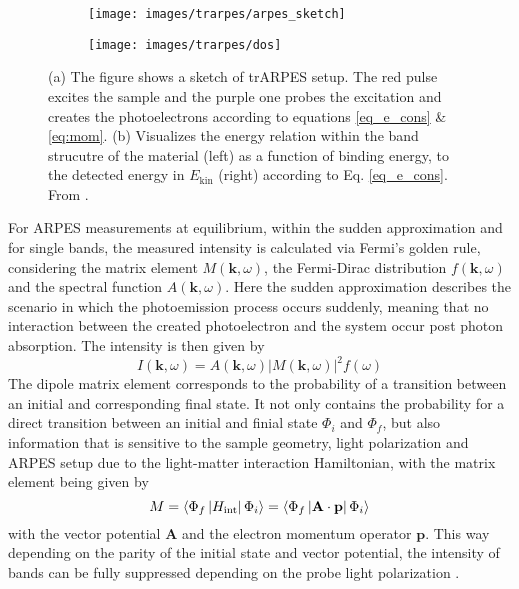 \begin{figure}
	\centering
	\begin{subfigure}[b]{0.49\textwidth}
		\texttt{[image: images/trarpes/arpes\_sketch]}
		\caption{}
	\end{subfigure}
	\hfill
	\begin{subfigure}[b]{0.4\textwidth}
		\texttt{[image: images/trarpes/dos]}
		\caption{}
	\end{subfigure}
	\caption{(a) The figure shows a sketch of trARPES setup. The red pulse excites the sample and the purple one probes the excitation and creates the photoelectrons according to equations \ref{eq_e_cons} \& \ref{eq:mom}. (b) Visualizes the energy relation within the band strucutre of the material (left) as a function of binding energy, to the detected energy in $E_\text{kin}$ (right) according to Eq. \ref{eq_e_cons}. From \cite{hufner_photoelectron_1995}.}
	\label{fig:arpes_sketch}
\end{figure}

For ARPES measurements at equilibrium, within the sudden approximation and for single bands, the measured intensity is calculated via Fermi's golden rule, considering the matrix element $M(\mathbf{k}, \omega)$, the Fermi-Dirac distribution $f(\mathbf{k}, \omega)$ and the spectral function $A(\mathbf{k}, \omega)$.
Here the sudden approximation describes the scenario in which the photoemission process occurs suddenly, meaning that no interaction between the created photoelectron and the system occur post photon absorption.
The intensity is then given by
\begin{equation}
	I(\mathbf{k}, \omega) = A(\mathbf{k}, \omega)\left|M(\mathbf{k}, \omega)\right|^2f(\omega)
	\label{eq:arpes_signal}
\end{equation}
The dipole matrix element corresponds to the probability of a transition between an initial and corresponding final state.
It not only contains the probability for a direct transition between an initial and finial state $\Phi_i$ and $\Phi_f$, but also information that is sensitive to the sample geometry, light polarization and ARPES setup due to the light-matter interaction Hamiltonian,
with the matrix element being given by
\begin{equation}
	M = \braket{\Phi_f\left|H_\text{int}\right|\Phi_i} =\braket{\Phi_f\left| \mathbf{A} \cdot \mathbf{p} \right|\Phi_i}
\end{equation}
with the vector potential $\mathbf{A}$ and the electron momentum operator $\mathbf{p}$.
This way depending on the parity of the initial state and vector potential, the intensity of bands can be fully suppressed depending on the probe light polarization \cite{gierz_illuminating_2011, cao_mapping_2013,zhu_layer-by-layer_2013,schuler_polarization-modulated_2022}.

